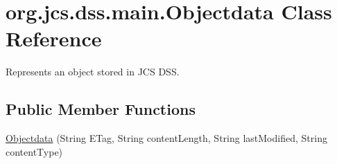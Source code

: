 \hypertarget{classorg_1_1jcs_1_1dss_1_1main_1_1Objectdata}{}\section{org.\+jcs.\+dss.\+main.\+Objectdata Class Reference}
\label{classorg_1_1jcs_1_1dss_1_1main_1_1Objectdata}


Represents an object stored in J\+CS D\+SS.  


\subsection*{Public Member Functions}
\begin{DoxyCompactItemize}
\item 
\hyperlink{classorg_1_1jcs_1_1dss_1_1main_1_1Objectdata_a1066762dacc178b06359f574e764b69f}{Objectdata} (String E\+Tag, String content\+Length, String last\+Modified, String content\+Type)\hypertarget{classorg_1_1jcs_1_1dss_1_1main_1_1Objectdata_a1066762dacc178b06359f574e764b69f}{}\label{classorg_1_1jcs_1_1dss_1_1main_1_1Objectdata_a1066762dacc178b06359f574e764b69f}


\end{DoxyCompactItemize}
